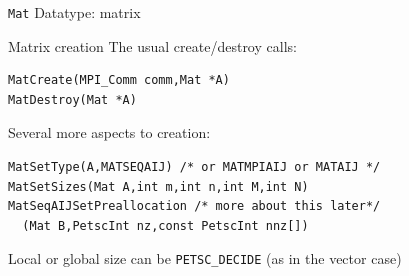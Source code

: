 
 {\texttt{Mat} Datatype: matrix}


\begin{numberedframe}{Matrix creation}
\small
The usual create/destroy calls:
\begin{lstlisting}
MatCreate(MPI_Comm comm,Mat *A)
MatDestroy(Mat *A)
\end{lstlisting}
Several more aspects to creation:
\begin{lstlisting}
MatSetType(A,MATSEQAIJ) /* or MATMPIAIJ or MATAIJ */
MatSetSizes(Mat A,int m,int n,int M,int N)
MatSeqAIJSetPreallocation /* more about this later*/
  (Mat B,PetscInt nz,const PetscInt nnz[])
\end{lstlisting}
Local or global size can be \lstinline{PETSC_DECIDE} (as in the vector case)
\end{numberedframe}

